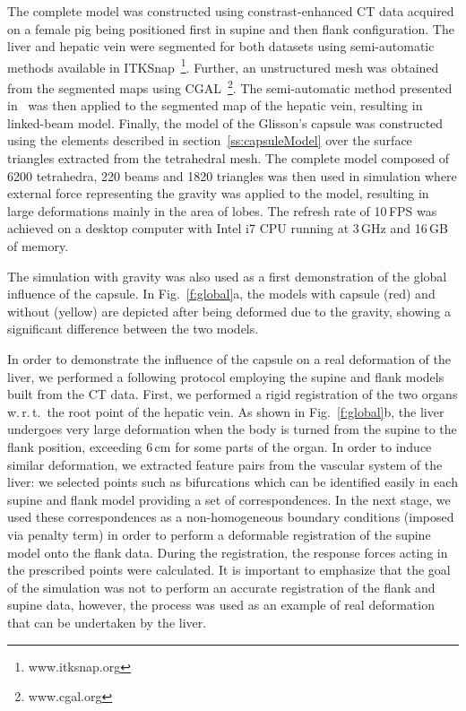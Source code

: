 \documentclass{llncs}
\def\wrt{w.\,r.\,t.}
\begin{document}
The complete model was constructed using constrast-enhanced CT data acquired on a female pig 
being positioned first in supine and then flank configuration. 
The liver and hepatic vein were segmented for both datasets  using semi-automatic methods available in ITKSnap~\footnote{www.itksnap.org}.
Further, an unstructured mesh was obtained from the segmented maps using CGAL~\footnote{www.cgal.org}. 
The semi-automatic method presented in~\cite{Peterlik2012} was 
then applied to the segmented map of the hepatic vein, resulting in linked-beam model. 
Finally, the model of the Glisson's capsule was constructed using the elements described in 
section~\ref{ss:capsuleModel} over the surface triangles extracted from the tetrahedral mesh. 
The complete model composed of 6200 tetrahedra, 220 beams and 1820 triangles was then 
used in simulation where external force representing the gravity was applied to the model, 
resulting in large deformations mainly in the area of lobes. The refresh rate of 10\,FPS 
was achieved on a desktop computer with Intel i7 CPU running at 3\,GHz and 16\,GB of memory. 

The simulation with gravity was also used as a first demonstration of the global influence of the capsule. 
In Fig.~\ref{f:global}a, the models with capsule (red) and without (yellow) are depicted after being 
deformed due to the gravity, showing a significant difference between the two models.  

In order to demonstrate the influence of the capsule on a real deformation of the liver, we 
performed a following protocol employing the supine and flank models built from the CT data. 
First, we performed a rigid registration of the two organs \wrt\ the root point of the hepatic vein. 
As shown in Fig.~\ref{f:global}b, the liver undergoes very large deformation when the body 
is turned from the supine to the flank position, exceeding 6\,cm for some parts of the organ. 
In order to induce similar deformation, we extracted feature pairs from the vascular system of the liver:
we selected points such as bifurcations which can be identified easily in each supine and flank 
model providing a set of correspondences. In the next stage, we used these correspondences as a non-homogeneous
boundary conditions (imposed via penalty term) in order to perform a deformable registration of the supine
model onto the flank data. During the registration, the response forces acting in the prescribed 
points were calculated. It is important to emphasize that the goal of the simulation was not 
to perform an accurate registration of the flank and supine data, however, the process was used 
as an example of real deformation that can be undertaken by the liver. 
\end{document}
